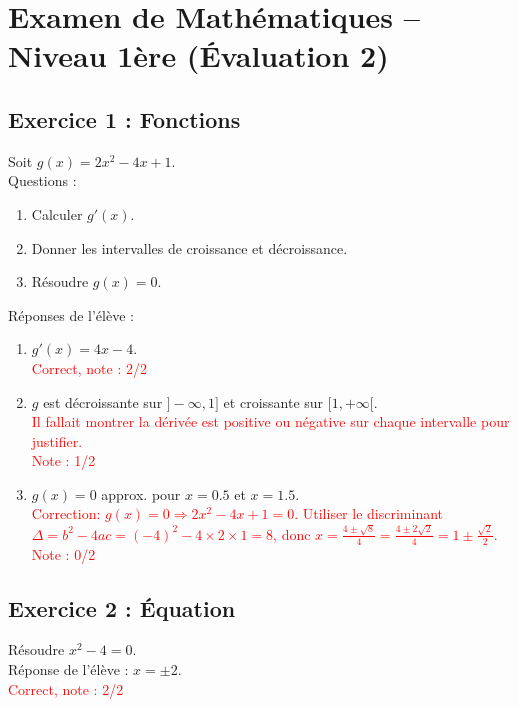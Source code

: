 \documentclass{article}
\begin{document}
\section*{Examen de Mathématiques – Niveau 1ère (Évaluation 2)}

\subsection*{Exercice 1 : Fonctions}
Soit $g(x) = 2x^2 - 4x + 1$. \\
Questions : 
\begin{enumerate}
    \item[a)] Calculer $g'(x)$.
    \item[b)] Donner les intervalles de croissance et décroissance.
    \item[c)] Résoudre $g(x) = 0$.
\end{enumerate}

Réponses de l’élève :
\begin{enumerate}
    \item[a)] $g'(x) = 4x - 4$. \\
    \textcolor{red}{Correct, note : 2/2}
    
    \item[b)] $g$ est décroissante sur $]-\infty, 1]$ et croissante sur $[1, +\infty[$.\\
    \textcolor{red}{Il fallait montrer la dérivée est positive ou négative sur chaque intervalle pour justifier.}\\
    \textcolor{red}{Note : 1/2}
    
    \item[c)] $g(x) = 0$ approx. pour $x = 0.5$ et $x = 1.5$.\\
    \textcolor{red}{Correction: $g(x) = 0 \Rightarrow 2x^2 - 4x + 1 = 0$.}
    \textcolor{red}{Utiliser le discriminant $\Delta = b^2 - 4ac = (-4)^2 - 4 \times 2 \times 1 = 8$,}
    \textcolor{red}{donc $x = \frac{4 \pm \sqrt{8}}{4} = \frac{4 \pm 2\sqrt{2}}{4} = 1 \pm \frac{\sqrt{2}}{2}$.}\\
    \textcolor{red}{Note : 0/2}
\end{enumerate}

\subsection*{Exercice 2 : Équation}
Résoudre $x^2 - 4 = 0$. \\
Réponse de l’élève : $x = \pm 2$. \\
\textcolor{red}{Correct, note : 2/2}
\end{document}
